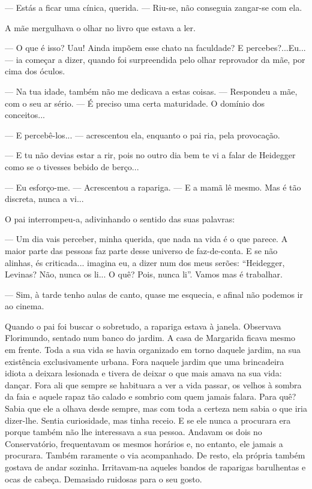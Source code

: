 --- Estás a ficar uma cínica, querida. ---  Riu-se, não conseguia zangar-se
com ela.

A mãe mergulhava o olhar no livro que estava a ler.

--- O que é isso? Uau! Ainda impõem esse chato na faculdade? E
percebes?...Eu... --- ia começar a dizer, quando foi surpreendida pelo
olhar reprovador da mãe, por cima dos óculos.

--- Na tua idade, também não me dedicava a estas coisas. --- Respondeu a
mãe, com o seu ar sério. --- É preciso uma certa maturidade. O domínio dos
conceitos...

--- E percebê-los... --- acrescentou ela, enquanto o pai ria, pela
provocação.

--- E tu não devias estar a rir, pois no outro dia bem te vi a falar de
Heidegger como se o tivesses bebido de berço...

--- Eu esforço-me. --- Acrescentou a rapariga. --- E a mamã lê mesmo. Mas é
tão discreta, nunca a vi...

O pai interrompeu-a, adivinhando o sentido das suas palavras:

--- Um dia vais perceber, minha querida, que nada na vida é o que parece.
A maior parte das pessoas faz parte desse universo de faz-de-conta. E se
não alinhas, és criticada... imagina eu, a dizer num dos meus serões:
``Heidegger, Levinas? Não, nunca os li... O quê? Pois, nunca li''. Vamos
mas é trabalhar.

--- Sim, à tarde tenho aulas de canto, quase me esquecia, e afinal não
podemos ir ao cinema.

Quando o pai foi buscar o sobretudo, a rapariga estava à janela.
Observava Florimundo, sentado num banco do jardim. A casa de Margarida
ficava mesmo em frente. Toda a sua vida se havia organizado em torno
daquele jardim, na sua existência exclusivamente urbana. Fora naquele
jardim que uma brincadeira idiota a deixara lesionada e tivera de deixar
o que mais amava na sua vida: dançar. Fora ali que sempre se habituara a
ver a vida passar, os velhos à sombra da faia e aquele rapaz tão calado
e sombrio com quem jamais falara. Para quê? Sabia que ele a olhava desde
sempre, mas com toda a certeza nem sabia o que iria dizer-lhe. Sentia
curiosidade, mas tinha receio. E se ele nunca a procurara era porque
também não lhe interessava a sua pessoa. Andavam os dois no
Conservatório, frequentavam os mesmos horários e, no entanto, ele jamais
a procurara. Também raramente o via acompanhado. De resto, ela própria
também gostava de andar sozinha. Irritavam-na aqueles bandos de
raparigas barulhentas e ocas de cabeça. Demasiado ruidosas para o seu
gosto.

